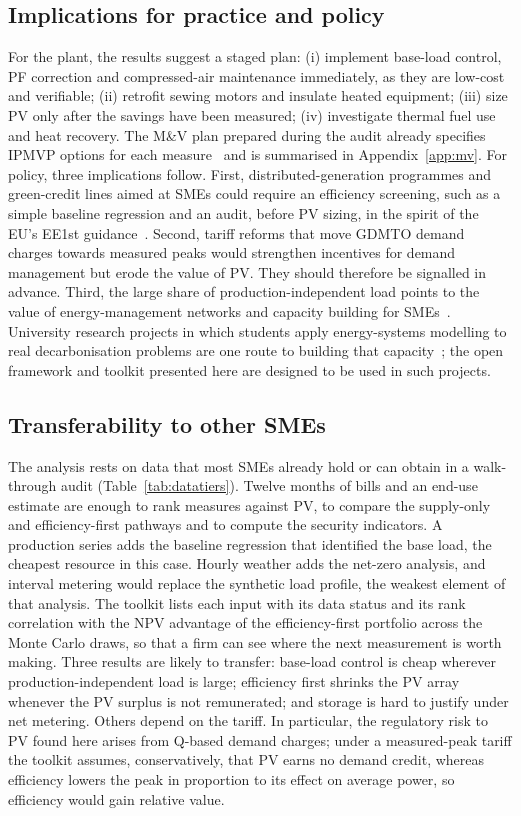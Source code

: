 \documentclass[processes,article,submit,pdftex,moreauthors]{Definitions/mdpi}
\begin{document}
\subsection{Implications for practice and policy}
For the plant, the results suggest a staged plan: (i) implement base-load control, PF correction and compressed-air maintenance immediately, as they are low-cost and verifiable; (ii) retrofit sewing motors and insulate heated equipment; (iii) size PV only after the savings have been measured; (iv) investigate thermal fuel use and heat recovery. The M\&V plan prepared during the audit already specifies IPMVP options for each measure~\cite{evo2022ipmvp} and is summarised in Appendix~\ref{app:mv}. For policy, three implications follow. First, distributed-generation programmes and green-credit lines aimed at SMEs could require an efficiency screening, such as a simple baseline regression and an audit, before PV sizing, in the spirit of the EU's EE1st guidance~\cite{ec2024ee1st}. Second, tariff reforms that move GDMTO demand charges towards measured peaks would strengthen incentives for demand management but erode the value of PV. They should therefore be signalled in advance. Third, the large share of production-independent load points to the value of energy-management networks and capacity building for SMEs~\cite{jalo2021,johansson2019,herce2024}. University research projects in which students apply energy-systems modelling to real decarbonisation problems are one route to building that capacity~\cite{garciakerdan2026educon}; the open framework and toolkit presented here are designed to be used in such projects.

\subsection{Transferability to other SMEs}
The analysis rests on data that most SMEs already hold or can obtain in a walk-through audit (Table~\ref{tab:datatiers}). Twelve months of bills and an end-use estimate are enough to rank measures against PV, to compare the supply-only and efficiency-first pathways and to compute the security indicators. A production series adds the baseline regression that identified the base load, the cheapest resource in this case. Hourly weather adds the net-zero analysis, and interval metering would replace the synthetic load profile, the weakest element of that analysis. The toolkit lists each input with its data status and its rank correlation with the NPV advantage of the efficiency-first portfolio across the Monte Carlo draws, so that a firm can see where the next measurement is worth making. Three results are likely to transfer: base-load control is cheap wherever production-independent load is large; efficiency first shrinks the PV array whenever the PV surplus is not remunerated; and storage is hard to justify under net metering. Others depend on the tariff. In particular, the regulatory risk to PV found here arises from Q-based demand charges; under a measured-peak tariff the toolkit assumes, conservatively, that PV earns no demand credit, whereas efficiency lowers the peak in proportion to its effect on average power, so efficiency would gain relative value.
\end{document}
